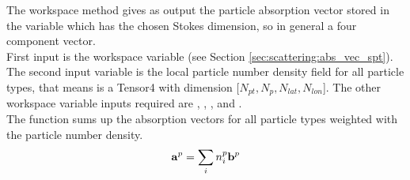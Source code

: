 \label{sec:scattering:abs_vec_part}

The workspace method  gives as output the
particle absorption vector  stored in the variable
 which has the chosen Stokes dimension, so in
general a four component vector.\\
First input is the workspace variable  (see Section
\ref{sec:scattering:abs_vec_spt}). The second input variable is the
local particle number density field  for all particle types,
that means  is a Tensor4 with dimension 
[$N_{pt}, N_{p}, N_{lat}, N_{lon}$]. The other workspace variable
inputs required are , ,
, and . \\  
The function sums up the absorption vectors for all particle types
weighted with the particle number density.
\begin{eqnarray}
  {\bf a}^{p} = \sum_i n^p_i {\bf b}^{p}
\end{eqnarray}


\label{sec:scattering:abs_vec_gas}


\label{sec:scattering:abs_vec_spt}

